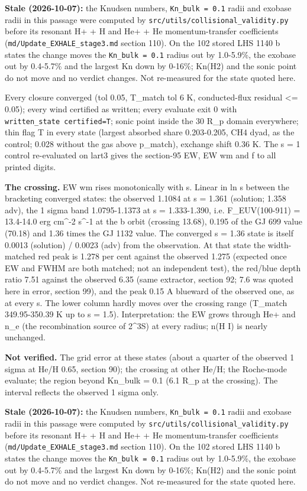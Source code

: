 \documentclass[english,a4paper]{my_memo}
\begin{document}
\textbf{Stale (2026-10-07):} the Knudsen numbers, \texttt{Kn\_bulk\ =\ 0.1} radii and exobase radii in this passage were computed by \texttt{src/utils/collisional\_validity.py} before its resonant H+ + H and He+ + He momentum-transfer coefficients (\texttt{md/Update\_EXHALE\_stage3.md} section 110). On the 102 stored LHS 1140 b states the change moves the \texttt{Kn\_bulk\ =\ 0.1} radius out by 1.0-5.9\%, the exobase out by 0.4-5.7\% and the largest Kn down by 0-16\%; Kn(H2) and the sonic point do not move and no verdict changes. Not re-measured for the state quoted here.

Every closure converged (tol 0.05, T\_match tol 6 K, conducted-flux residual
\textless= 0.05); every wind certified as written; every evaluate exit 0 with
\texttt{written\_state\ certified=T}; sonic point inside the 30 R\_p domain
everywhere; thin flag T in every state (largest absorbed share 0.203-0.205,
CH4 dyad, as the control; 0.028 without the gas above p\_match), exchange
shift 0.36 K. The s = 1 control re-evaluated on lart3 gives the section-95
EW, EW wm and f to all printed digits.

\textbf{The crossing.} EW wm rises monotonically with s. Linear in ln s between
the bracketing converged states: the observed 1.1084 at s = 1.361 (solution;
1.358 adv), the 1 sigma band 1.0795-1.1373 at s = 1.333-1.390, i.e.
F\_EUV(100-911) = 13.4-14.0 erg cm\^{}-2 s\^{}-1 at the b orbit (crossing 13.68),
0.195 of the GJ 699 value (70.18) and 1.36 times the GJ 1132 value. The
converged s = 1.36 state is itself 0.0013 (solution) / 0.0023 (adv) from
the observation. At that state the width-matched red peak is 1.278 per cent
against the observed 1.275 (expected once EW and FWHM are both matched;
not an independent test), the red/blue depth ratio 7.51 against the observed 6.35 (same extractor, section 92;
7.6 was quoted here in error, section 99), and the
peak 0.15 A blueward of the observed one, as at every s. The lower column
hardly moves over the crossing range (T\_match 349.95-350.39 K up to s =
1.5). Interpretation: the EW grows through He+ and n\_e (the recombination
source of 2\^{}3S) at every radius; n(H I) is nearly unchanged.

\textbf{Not verified.} The grid error at these states (about a quarter of the
observed 1 sigma at He/H 0.65, section 90); the crossing at other He/H; the
Roche-mode evaluate; the region beyond Kn\_bulk = 0.1 (6.1 R\_p at the
crossing). The interval reflects the observed 1 sigma only.

\textbf{Stale (2026-10-07):} the Knudsen numbers, \texttt{Kn\_bulk\ =\ 0.1} radii and exobase radii in this passage were computed by \texttt{src/utils/collisional\_validity.py} before its resonant H+ + H and He+ + He momentum-transfer coefficients (\texttt{md/Update\_EXHALE\_stage3.md} section 110). On the 102 stored LHS 1140 b states the change moves the \texttt{Kn\_bulk\ =\ 0.1} radius out by 1.0-5.9\%, the exobase out by 0.4-5.7\% and the largest Kn down by 0-16\%; Kn(H2) and the sonic point do not move and no verdict changes. Not re-measured for the state quoted here.
\end{document}
